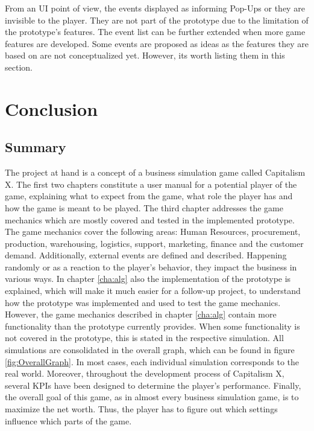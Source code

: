 \documentclass[11pt,titlepage,oneside,openany]{book}
\begin{document}
From an UI point of view, the events displayed as informing Pop-Ups or they are invisible to the player. They are not part of the prototype due to the limitation of the prototype's features. The event list can be further extended when more game features are developed. Some events are proposed as ideas as the features they are based on are not conceptualized yet. However, its worth listing them in this section. 



\chapter{Conclusion}
\label{sec:conclusion}

\section{Summary}
\label{sec:summary}
The project at hand is a concept of a business simulation game called Capitalism X. The first two chapters constitute a user manual for a potential player of the game, explaining what to expect from the  game, what role the player has and how the game is meant to be played. The third chapter addresses the game mechanics which are mostly covered and tested in the implemented prototype. The game mechanics cover the following areas: Human Resources, procurement, production, warehousing, logistics, support, marketing, finance and the customer demand. Additionally, external events are defined and described. Happening randomly or as a reaction to the player's behavior, they impact the business in various ways. 
In chapter \ref{cha:alg} also the implementation of the prototype is explained, which will make it much easier for a follow-up project, to understand how the prototype was implemented and used to test the game mechanics. 
However, the game mechanics described in chapter \ref{cha:alg} contain more functionality than the prototype currently provides. When some functionality is not covered in the prototype, this is stated in the respective simulation. All simulations are consolidated in the overall graph, which can be found in figure \ref{fig:OverallGraph}. In most cases, each individual simulation corresponds to the real world.
Moreover, throughout the development process of Capitalism X, several KPIs have been designed to determine the player's performance. Finally, the overall goal of this game, as in almost every business simulation game, is to maximize the net worth. Thus, the player has to figure out which settings influence which parts of the game.
\end{document}
